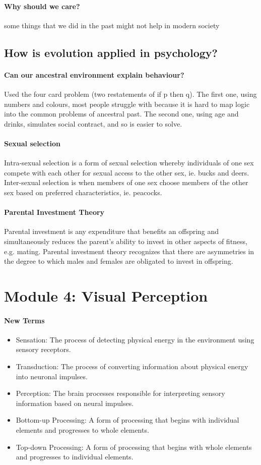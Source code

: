 \documentclass[10pt,letter]{article}
\theoremstyle{plain}
\theoremstyle{definition}
\begin{document}
\paragraph{Why should we care?}
some things that we did in the past might not help in modern society


\subsection*{How is evolution applied in psychology?}
\paragraph{Can our ancestral environment explain behaviour?}
Used the four card problem (two restatements of if p then q). The first one, using numbers and colours, most people struggle with because it is hard to map logic into the common problems of ancestral past. The second one, using age and drinks, simulates social contract, and so is easier to solve. 
\paragraph{Sexual selection}
Intra-sexual selection is a form of sexual selection whereby individuals of one sex compete with each other for sexual access to the other sex, ie. bucks and deers. Inter-sexual selection is when members of one sex choose members of the other sex based on preferred characteristics, ie. peacocks. 
\paragraph{Parental Investment Theory}
Parental investment is any expenditure that benefits an offspring and simultaneously reduces the parent's ability to invest in other aspects of fitness, e.g. mating. Parental investment theory recognizes that there are asymmetries in the degree to which males and females are obligated to invest in offspring. 


\section*{Module 4: Visual Perception}
\paragraph{New Terms}
\begin{itemize}
    \item Sensation: The process of detecting physical energy in the environment using sensory receptors. 
    \item Transduction: The process of converting information about physical energy into neuronal impulses. 
    \item Perception: The brain processes responsible for interpreting sensory information based on neural impulses. 
    \item Bottom-up Processing: A form of processing that begins with individual elements and progresses to whole elements. 
    \item Top-down Processing: A form of processing that begins with whole elements and progresses to individual elements.
\end{itemize}
\end{document}
